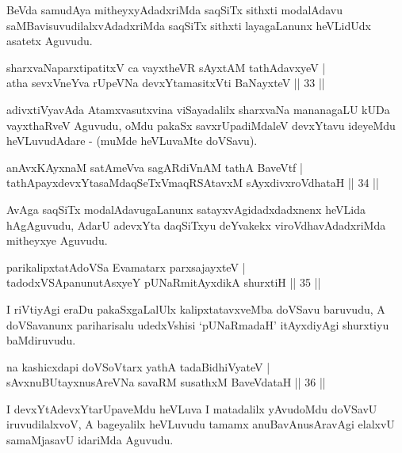 \begin{artha}
BeVda samudAya mitheyxyAdadxriMda saqSiTx sithxti modalAdavu saMBavisuvudilalxvAdadxriMda saqSiTx sithxti layagaLanunx heVLidUdx asatetx Aguvudu.
\end{artha}

\begin{shl}
sharxvaNaparxtipatitxV ca vayxtheVR sAyxtAM tathA\s davxyeV  | \\
atha sevxVneYva rUpeVNa devxYtamasitxVti BaNayxteV \hfill||  33 ||  
\end{shl}

\begin{artha}
adivxtiVyavAda Atamxvasutxvina viSayadalilx sharxvaNa mananagaLU kUDa vayxthaRveV Aguvudu, oMdu pakaSx savxrUpadiMdaleV devxYtavu ideyeMdu heVLuvudAdare - (muMde heVLuvaMte doVSavu).
\end{artha}
	
\begin{shl}
anAvxKAyxnaM satAmeVva sagARdiVnAM tathA BaveVtf  | \\
tathA\s payxdevxYtasaMdaqSeTxVmaqRSAtavxM sAyxdivxroVdhataH \hfill||  34 ||  
\end{shl}

\begin{artha}
AvAga saqSiTx modalAdavugaLanunx satayxvAgidadxdadxnenx heVLida hAgAguvudu, AdarU adevxYta daqSiTxyu deYvakekx viroVdhavAdadxriMda mitheyxye Aguvudu.
\end{artha}

\begin{shl}
parikalipxtatAdoVSa Evamatarx parxsajayxteV  | \\
tadodxVSApanunutAsxyeY pUNaRmitAyxdikA shurxtiH \hfill||  35 ||  
\end{shl}

\begin{artha}
I riVtiyAgi eraDu pakaSxgaLalUlx kalipxtatavxveMba doVSavu baruvudu, A doVSavanunx pariharisalu udedxVshisi `pUNaRmadaH' itAyxdiyAgi shurxtiyu baMdiruvudu.
\end{artha}


\begin{shl}
na kashicxdapi doVSoV\s tarx yathA tadaBidhiVyateV  | \\
sAvxnuBUtayxnusAreVNa savaRM susathxM BaveVdataH \hfill||  36 ||  
\end{shl}

\begin{artha}
I devxYtAdevxYtarUpaveMdu heVLuva I matadalilx yAvudoMdu doVSavU iruvudilalxvoV, A bageyalilx heVLuvudu tamamx anuBavAnusAravAgi elalxvU samaMjasavU idariMda Aguvudu.
\end{artha}

